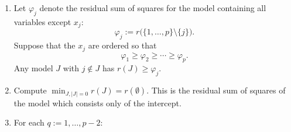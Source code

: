 \documentclass[
  a4paper,
]{article}
\theoremstyle{definition}
\theoremstyle{definition}
\theoremstyle{definition}
\theoremstyle{definition}
\theoremstyle{remark}
\begin{document}
\begin{enumerate}
\def\labelenumi{\Alph{enumi}.}
\item
  Let \(\varphi_j\) denote the residual sum of squares for the model containing
  all variables except \(x_j\):
  \begin{equation*}
        \varphi_j := r\bigl( \{ 1, \ldots, p \} \setminus \{ j \} \bigr).
    \end{equation*}
  Suppose that the \(x_j\) are ordered so that
  \begin{equation*}
        \varphi_1 \geq \varphi_2 \geq \cdots \geq \varphi_p.
    \end{equation*}
  Any model \(J\) with \(j \notin J\) has \(r(J) \geq \varphi_j\).
\item
  Compute \(\min_{J, |J|=0} r(J) = r(\emptyset)\). This is the residual
  sum of squares of the model which consists only of the intercept.
\item
  For each \(q := 1, \ldots, p-2\):


\end{enumerate}
\end{document}
